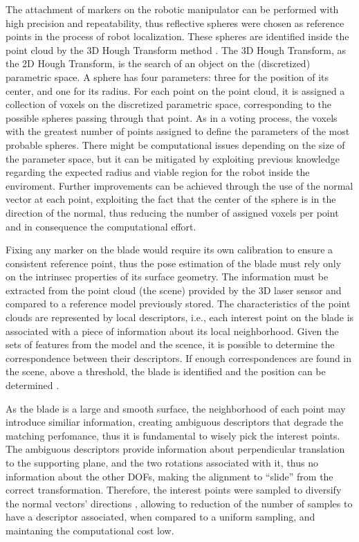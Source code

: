 The attachment of markers on the robotic manipulator can be performed with high
precision and repeatability, thus reflective spheres were chosen as reference
points in the process of robot localization. These spheres are identified inside
the point cloud by the 3D Hough Transform method \cite{camurri20143d}. The 3D
Hough Transform, as the 2D Hough Transform, is the search of an object on the
(discretized) parametric space. A sphere has four parameters: three for the
position of its center, and one for its radius. For each point on the point
cloud, it is assigned a collection of voxels on the discretized parametric
space, corresponding to the possible spheres passing through that point. As in a
voting process, the voxels with the greatest number of points assigned to define
the parameters of the most probable spheres. There might be computational issues
depending on the size of the parameter space, but it can be mitigated by
exploiting previous knowledge regarding the expected radius and viable region
for the robot inside the enviroment. Further improvements can be achieved
through the use of the normal vector at each point, exploiting the fact that
the center of the sphere is in the direction of the normal, thus reducing the
number of assigned voxels per point and in consequence the computational effort.

Fixing any marker on the blade would require its own calibration to ensure a
consistent reference point, thus the pose estimation of the blade must rely only
on the intrinsec properties of its surface geometry. The information must be extracted from
the point cloud (the scene) provided by the 3D laser sensor and
compared to a reference model previously stored. The characteristics of the point clouds are represented
by local descriptors, i.e., each interest point on the blade is associated
with a piece of information about its local neighborhood. Given the
sets of features from the model and the scence,  it is possible to determine the
correspondence between their descriptors. If enough correspondences are found
in the scene, above a threshold, the blade is identified and the position can be
determined \cite{Tombari2010a}.

As the blade is a large and smooth surface, the neighborhood of each point may
introduce similiar information, creating ambiguous descriptors that degrade the
matching perfomance, thus it is fundamental to wisely pick the interest points.
The ambiguous descriptors provide information about perpendicular translation to
the supporting plane, and the two rotations associated with it, thus no
information about the other DOFs, making the alignment to ``slide'' from the
correct transformation. Therefore, the interest points were sampled to
diversify the normal vectors' directions \cite{Rusinkiewicz2001}, allowing to
reduction of the number of samples to have a descriptor associated, when
compared to a uniform sampling, and maintaning the computational cost low.


